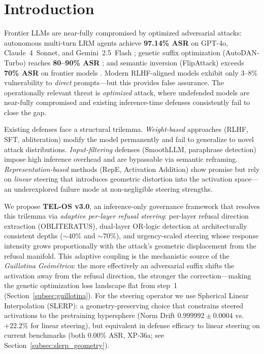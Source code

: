 \documentclass{article}
\begin{document}
\section{Introduction}
\label{sec:introduction}

Frontier LLMs are near-fully compromised by optimized adversarial attacks:
autonomous multi-turn LRM agents achieve \textbf{97.14\% ASR} on GPT-4o,
Claude~4~Sonnet, and Gemini~2.5~Flash \citep{hagendorff2026lrm};
genetic suffix optimization (AutoDAN-Turbo) reaches \textbf{80--90\% ASR}
\citep{liu2024autodan};
and semantic inversion (FlipAttack) exceeds \textbf{70\% ASR} on frontier models
\citep{liu2025flipattack}.
Modern RLHF-aligned models exhibit only 3--8\% vulnerability to \textit{direct}
prompts---but this provides false assurance.
The operationally relevant threat is \textit{optimized} attack, where undefended
models are near-fully compromised and existing inference-time defenses
consistently fail to close the gap.

Existing defenses face a structural trilemma.
\textit{Weight-based} approaches (RLHF, SFT, abliteration) modify the model
permanently and fail to generalize to novel attack distributions.
\textit{Input-filtering} defenses (SmoothLLM, paraphrase detection) impose
high inference overhead and are bypassable via semantic reframing.
\textit{Representation-based} methods (RepE, Activation Addition) show promise
but rely on \textit{linear} steering that introduces geometric distortion into
the activation space---an underexplored failure mode at non-negligible steering
strengths.

We propose \textbf{TEL-OS v3.0}, an inference-only governance framework that
resolves this trilemma via \textit{adaptive per-layer refusal steering}:
per-layer refusal direction extraction (\textsc{OBLITERATUS}), dual-layer
OR-logic detection at architecturally consistent depths (${{\sim}}40\%$ and
${{\sim}}70\%$), and urgency-scaled steering whose response intensity grows
proportionally with the attack's geometric displacement from the refusal manifold.
This adaptive coupling is the mechanistic source of the \textit{Guillotina
Ge\'om\'{e}trica}: the more effectively an adversarial suffix shifts the activation
away from the refusal direction, the stronger the correction---making the genetic
optimization loss landscape flat from step~1 (Section~\ref{subsec:guillotina}).
For the steering operator we use Spherical Linear Interpolation (SLERP): a
geometry-preserving choice that constrains steered activations to the pretraining
hypersphere (Norm Drift $0.999992 \pm 0.0004$ vs.\ $+22.2\%$ for linear steering),
but equivalent in defense efficacy to linear steering on current benchmarks
(both 0.00\% ASR, XP-36a; see Section~\ref{subsec:slerp_geometry}).
\end{document}
